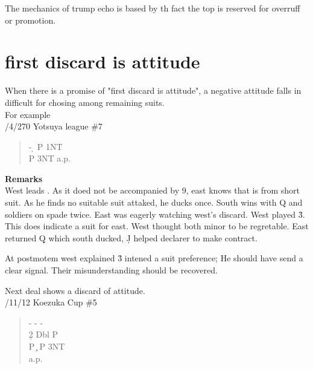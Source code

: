 The mechanics of trump echo is based by th fact the top is reserved for
overruff or promotion.



\section{first discard is attitude}

When there is a promise of "first discard is attitude", a negative
attitude falls in difficult for chosing among remaining suits.\\
For example\\
/4/270 Yotsuya league \#7
\begin{quote}
%
  {}%
  {}
  {}%
  {}%
\end{quote}
\begin{quote}
\begin{bidding}
- \d  \> P \> 1NT \\
P \> 3NT \> a.p.
\end{bidding}
\end{quote}
{\bf Remarks}\\

West leads . As it doed not be accompanied by 9, east
knows that is from short suit. As he finds no suitable suit attaked,
he ducks once. South wins with \s Q and soldiers on spade twice.
East was eagerly watching west's discard. West played \h 3.
This does indicate a suit for east. West thought both minor to
be regretable. East returned \d Q which south ducked, \d J helped
declarer to make contract.

At postmotem west explained \h 3 intened a suit preference;
He should have send a clear signal. Their misunderstanding
should be recovered.

\vspace{0.5cm}

Next deal shows a discard of attitude.\\

/11/12 Koezuka Cup \#5
\begin{quote}
%
  {}%
  {}
  {}%
  {}%
\end{quote}
\begin{quote}
\begin{bidding}
- \> -  \> - \c \\
2\d  \> Dbl \> P \s \\
P \c \> P \> 3NT \\
a.p.
\end{bidding}
\end{quote}

